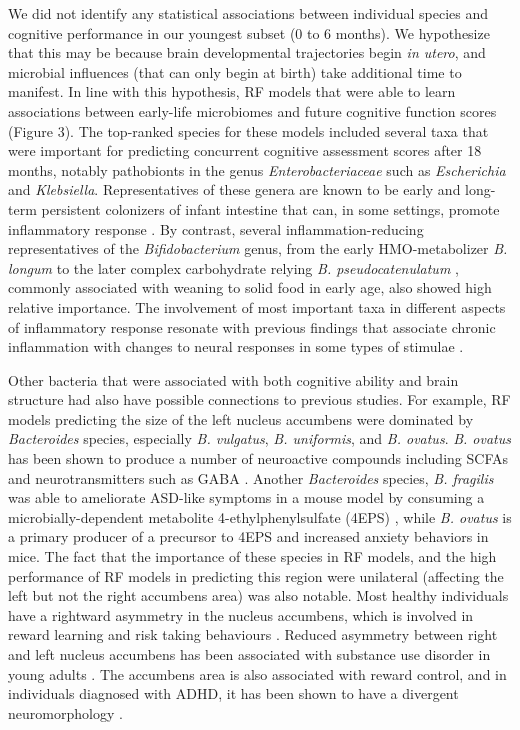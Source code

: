 \documentclass{article}
\begin{document}
We did not identify any statistical associations between individual species
and cognitive performance in our youngest subset (0 to 6 months).
We hypothesize that this may be because brain developmental trajectories
begin \textit{in utero}, and microbial influences (that can only begin at birth)
take additional time to manifest.
In line with this hypothesis, RF models that were able to learn associations
between early-life microbiomes and future cognitive function scores (Figure 3).
The top-ranked species for these models included several 
taxa that were important for predicting concurrent cognitive assessment scores after 18 months, notably
pathobionts in the genus \textit{Enterobacteriaceae} such as
\textit{Escherichia} and \textit{Klebsiella}. 
Representatives of these genera are known to be early and long-term persistent
colonizers of infant intestine that can, in some settings,
promote inflammatory response \cite{popeEnterobacEarlyGut2019}.
By contrast, several inflammation-reducing representatives
of the \textit{Bifidobacterium} genus,
from the early HMO-metabolizer \textit{B. longum} to the
later complex carbohydrate relying \textit{B. pseudocatenulatum} \cite{chungBifidoPsudocatenulatum2021},
commonly associated with weaning to solid food in early age,
also showed high relative importance.
The involvement of most important taxa in different aspects of inflammatory response
resonate with previous findings that associate chronic inflammation with
changes to neural responses in some types of stimulae \cite{xieChronicInfNeuro2019}.

Other bacteria that were associated with both cognitive ability and
brain structure had also have possible connections to previous studies.
For example, RF models predicting the size of the left nucleus accumbens
were dominated by \textit{Bacteroides} species,
especially \textit{B. vulgatus}, \textit{B. uniformis}, and \textit{B. ovatus}.
\textit{B. ovatus} has been shown to produce
a number of neuroactive compounds including SCFAs and neurotransmitters
such as GABA \cite{horvathBacteroidesOvatusColonization2022}.
Another \textit{Bacteroides} species, \textit{B. fragilis} was
able to ameliorate ASD-like symptoms in a mouse model
by consuming a microbially-dependent metabolite 4-ethylphenylsulfate (4EPS)
\cite{hsiaoMicrobiotaModulateBehavioral2013},
while \textit{B. ovatus} is a primary producer of a precursor to 4EPS
\cite{needhamGutderivedMetaboliteAlters2022} and increased anxiety
behaviors in mice.
The fact that the importance of these species in RF models,
and the high performance of RF models in predicting this region
were unilateral (affecting the left but not the right accumbens area)
was also notable. Most healthy individuals have a
rightward asymmetry in the nucleus accumbens,
which is involved in reward learning and risk taking behaviours
\cite{ernstAmygdalaNucleusAccumbens2005,yauNucleusAccumbensResponse2012}.
Reduced asymmetry between right and left nucleus accumbens
has been associated with substance use disorder in young adults
\cite{caoMappingCorticalSubcortical2021}. The accumbens area is also
associated with reward control, and in individuals diagnosed with ADHD,
it has been shown to have a divergent neuromorphology
\cite{hoogmanSubcorticalBrainVolume2017}.
\end{document}
